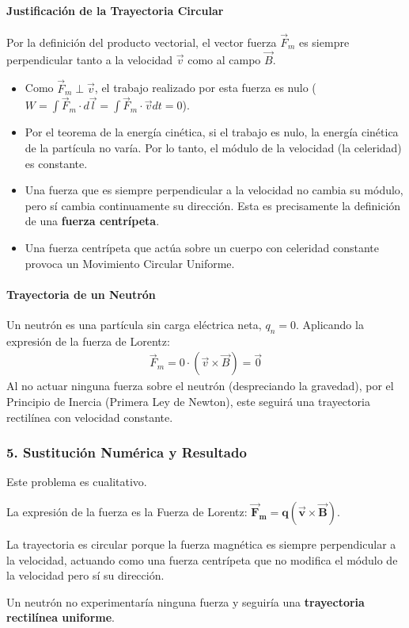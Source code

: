 \paragraph*{Justificación de la Trayectoria Circular}
Por la definición del producto vectorial, el vector fuerza $\vec{F}_m$ es siempre perpendicular tanto a la velocidad $\vec{v}$ como al campo $\vec{B}$.
\begin{itemize}
    \item Como $\vec{F}_m \perp \vec{v}$, el trabajo realizado por esta fuerza es nulo ($W = \int \vec{F}_m \cdot d\vec{l} = \int \vec{F}_m \cdot \vec{v} dt = 0$).
    \item Por el teorema de la energía cinética, si el trabajo es nulo, la energía cinética de la partícula no varía. Por lo tanto, el módulo de la velocidad (la celeridad) es constante.
    \item Una fuerza que es siempre perpendicular a la velocidad no cambia su módulo, pero sí cambia continuamente su dirección. Esta es precisamente la definición de una \textbf{fuerza centrípeta}.
    \item Una fuerza centrípeta que actúa sobre un cuerpo con celeridad constante provoca un Movimiento Circular Uniforme.
\end{itemize}

\paragraph*{Trayectoria de un Neutrón}
Un neutrón es una partícula sin carga eléctrica neta, $q_n = 0$. Aplicando la expresión de la fuerza de Lorentz:
\begin{gather}
    \vec{F}_m = 0 \cdot (\vec{v} \times \vec{B}) = \vec{0}
\end{gather}
Al no actuar ninguna fuerza sobre el neutrón (despreciando la gravedad), por el Principio de Inercia (Primera Ley de Newton), este seguirá una trayectoria rectilínea con velocidad constante.

\subsubsection*{5. Sustitución Numérica y Resultado}
Este problema es cualitativo.
\begin{cajaresultado}
    La expresión de la fuerza es la Fuerza de Lorentz: $\boldsymbol{\vec{F}_m = q (\vec{v} \times \vec{B})}$.
\end{cajaresultado}
\begin{cajaresultado}
    La trayectoria es circular porque la fuerza magnética es siempre perpendicular a la velocidad, actuando como una fuerza centrípeta que no modifica el módulo de la velocidad pero sí su dirección.
\end{cajaresultado}
\begin{cajaresultado}
    Un neutrón no experimentaría ninguna fuerza y seguiría una \textbf{trayectoria rectilínea uniforme}.
\end{cajaresultado}

